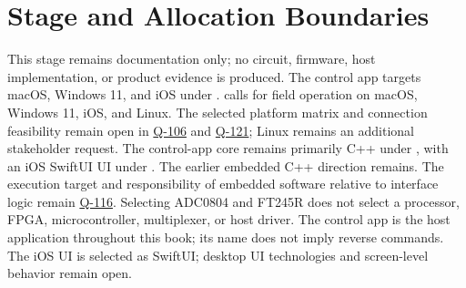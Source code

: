 \section{Stage and Allocation Boundaries}
This stage remains documentation only; no circuit, firmware, host implementation, or product evidence is produced. The control app targets macOS, Windows 11, and iOS under .  calls for field operation on macOS, Windows 11, iOS, and Linux. The selected platform matrix and connection feasibility remain open in \hyperref[Question:Q-106]{Q-106} and \hyperref[Question:Q-121]{Q-121}; Linux remains an additional stakeholder request. The control-app core remains primarily C++ under , with an iOS SwiftUI UI under . The earlier embedded C++ direction remains. The execution target and responsibility of embedded software relative to interface logic remain \hyperref[Question:Q-116]{Q-116}. Selecting ADC0804 and FT245R does not select a processor, FPGA, microcontroller, multiplexer, or host driver. The control app is the host application throughout this book; its name does not imply reverse commands. The iOS UI is selected as SwiftUI; desktop UI technologies and screen-level behavior remain open.
